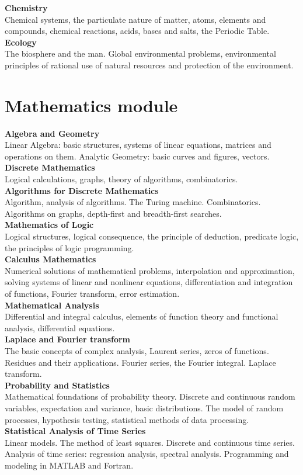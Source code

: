 \documentclass[a4paper, 12pt]{article}
\newcommand{\group}[1] {\section{#1}}
\newcommand{\discipline}[1] {\textbf{#1} \\ }
\newcommand{\desc}[1] { #1 \\ }
\begin{document}
\discipline{Chemistry}
\desc{Chemical systems, the particulate nature of matter, atoms, elements and compounds, chemical reactions, acids, bases and salts, the Periodic Table.}

\discipline{Ecology}
\desc{The biosphere and the man. Global environmental problems, environmental principles of rational use of natural resources and protection of the environment.}


\group{Mathematics module}

\discipline{Algebra and Geometry}
\desc{Linear Algebra: basic structures, systems of linear equations, matrices and operations on them. Analytic Geometry: basic curves and figures, vectors.}

\discipline{Discrete Mathematics}
\desc{Logical calculations, graphs, theory of algorithms, combinatorics.}

\discipline{Algorithms for Discrete Mathematics}
\desc{Algorithm, analysis of algorithms. The Turing machine. Combinatorics. Algorithms on graphs, depth-first and breadth-first searches.}

\discipline{Mathematics of Logic}
\desc{Logical structures, logical consequence, the principle of deduction, predicate logic, the principles of logic programming.}

\discipline{Calculus Mathematics}
\desc{Numerical solutions of mathematical problems, interpolation and approximation, solving systems of linear and nonlinear equations, differentiation and integration of functions, Fourier transform, error estimation.}

\discipline{Mathematical Analysis}
\desc{Differential and integral calculus, elements of function theory and functional analysis, differential equations.}

\discipline{Laplace and Fourier transform}
\desc{The basic concepts of complex analysis, Laurent series, zeros of functions. Residues and their applications. Fourier series, the Fourier integral. Laplace transform.}

\discipline{Probability and Statistics}
\desc{Mathematical foundations of probability theory. Discrete and continuous random variables, expectation and variance, basic distributions. The model of random processes, hypothesis testing, statistical methods of data processing.}

\discipline{Statistical Analysis of Time Series}
\desc{Linear models. The method of least squares. Discrete and continuous time series. Analysis of time series: regression analysis, spectral analysis. Programming and modeling in MATLAB and Fortran.}
\end{document}
